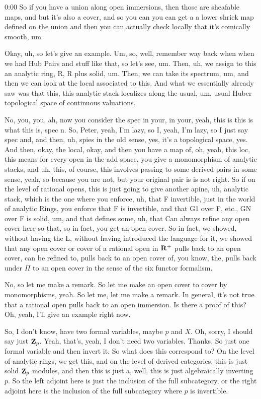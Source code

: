 \begin{unfinished}{0:00}
So if you have a union along open immersions, then those are sheafable maps, and but it's also a cover, and so you can you can get a a lower shriek map defined on the union and then you can actually check locally that it's comically smooth, um.

Okay, uh, so let's give an example. Um, so, well, remember way back when when we had Hub Pairs and stuff like that, so let's see, um. Then, uh, we assign to this an analytic ring, R, R plus solid, um. Then, we can take its spectrum, um, and then we can look at the local associated to this. And what we essentially already saw was that this, this analytic stack localizes along the usual, um, usual Huber topological space of continuous valuations.

No, you, you, ah, now you consider the spec in your, in your, yeah, this is this is what this is, spec n. So, Peter, yeah, I'm lazy, so I, yeah, I'm lazy, so I just say spec and, and then, uh, spies in the old sense, yes, it's a topological space, yes. And then, okay, the local, okay, and then you have a map of, oh, yeah, this loc, this means for every open in the add space, you give a monomorphism of analytic stacks, and uh, this, of course, this involves passing to some derived pairs in some sense, yeah, so because you are not, but your original pair is is not right. So if on the level of rational opens, this is just going to give another apine, uh, analytic stack, which is the one where you enforce, uh, that F invertible, just in the world of analytic Rings, you enforce that F is invertible, and that G1 over F, etc., GN over F is solid, um, and that defines some, uh, that
Can always refine any open cover here so that, so in fact, you get an open cover. So in fact, we showed, without having the L, without having introduced the language for it, we showed that any open cover or cover of a rational open in $\mathbf R^+$ pulls back to an open cover, can be refined to, pulls back to an open cover of, you know, the, pulls back under $\Pi$ to an open cover in the sense of the six functor formalism.

No, so let me make a remark. So let me make an open cover to cover by monomorphisms, yeah. So let me, let me make a remark. In general, it's not true that a rational open pulls back to an open immersion. Is there a proof of this? Oh, yeah, I'll give an example right now.

So, I don't know, have two formal variables, maybe $p$ and $X$. Oh, sorry, I should say just $\mathbf Z_p$. Yeah, that's, yeah, I don't need two variables. Thanks. So just one formal variable and then invert it. So what does this correspond to? On the level of analytic rings, we get this, and on the level of derived categories, this is just solid $\mathbf Z_p$ modules, and then this is just a, well, this is just algebraically inverting $p$. So the left adjoint here is just the inclusion of the full subcategory, or the right adjoint here is the inclusion of the full subcategory where $p$ is invertible.


\end{unfinished}
